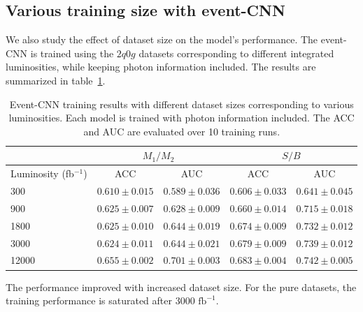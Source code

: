 \documentclass[12pt]{article}
\begin{document}
    \subsection{Various training size with event-CNN}%
    \label{sub:various_training_size_with_event_cnn}
        We also study the effect of dataset size on the model's performance. The event-CNN is trained using the $2q0g$ datasets corresponding to different integrated luminosities, while keeping photon information included. The results are summarized in table~\ref{tab:CWoLa_event_CNN_training_results_jet_tagging_various_L}.
        \begin{table}[htpb]
            \centering
            \caption{Event-CNN training results with different dataset sizes corresponding to various luminosities. Each model is trained with photon information included. The ACC and AUC are evaluated over 10 training runs.}
            \label{tab:CWoLa_event_CNN_training_results_jet_tagging_various_L}
            \begin{tabular}{l|cc|cc}
                                        & \multicolumn{2}{c|}{$M_1 / M_2$}      & \multicolumn{2}{c}{$S / B$}           \\ \hline
                Luminosity (fb$^{-1}$)  & ACC               & AUC               & ACC               & AUC               \\ \hline
                300                     & $0.610 \pm 0.015$ & $0.589 \pm 0.036$ & $0.606 \pm 0.033$ & $0.641 \pm 0.045$ \\
                900                     & $0.625 \pm 0.007$ & $0.628 \pm 0.009$ & $0.660 \pm 0.014$ & $0.715 \pm 0.018$ \\
                1800                    & $0.625 \pm 0.010$ & $0.644 \pm 0.019$ & $0.674 \pm 0.009$ & $0.732 \pm 0.012$ \\
                3000                    & $0.624 \pm 0.011$ & $0.644 \pm 0.021$ & $0.679 \pm 0.009$ & $0.739 \pm 0.012$ \\
                12000                   & $0.655 \pm 0.002$ & $0.701 \pm 0.003$ & $0.683 \pm 0.004$ & $0.742 \pm 0.005$
            \end{tabular}
        \end{table}
        The performance improved with increased dataset size. For the pure datasets, the training performance is saturated after $3000 \text{ fb}^{-1}$.
\end{document}
